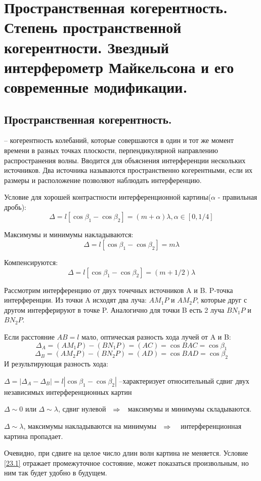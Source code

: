 \section{Пространственная когерентность. Степень пространственной когерентности. Звездный интерферометр Майкельсона и его современные модификации. } 
\subsection{Пространственная когерентность.}

  --  когерентность колебаний, которые совершаются в один и тот же момент времени в разных точках плоскости, перпендикулярной направлению распространения волны.
Вводится для объяснения интерференции нескольких источников.
Два источника называются пространственно когерентными, если их размеры и расположение позволяют наблюдать интерференцию.
\begin{theor}\label{2  некогерентных точечных источника.}

Условие для хорошей контрастности интерференционной картины($\alpha$ - правильная дробь):
\begin{equation}
\Delta = l[\cos{\beta_1}-\cos{\beta_2}]=(m+\alpha)\lambda, \alpha \in [0, 1/4]\label{23.1}
\end{equation}

Максимумы и минимумы накладываются:
\begin{equation}
\Delta = l[\cos{\beta_1}-\cos{\beta_2}]=m\lambda \label{23.2}
\end{equation}

Компенсируются:
\begin{equation}
\Delta = l[\cos{\beta_1}-\cos{\beta_2}]=(m+1/2)\lambda\label{23.3}
\end{equation}
\end{theor}
\begin{proofn}
Рассмотрим интерференцию от двух точечных источников A и B. P-точка интерференции. Из точки A исходят два луча: $AM_1P$ и $AM_2P$, которые друг с другом интерферируют в точке P. Аналогично для точки B есть 2 луча $BN_1P$ и $BN_2P$. 
\begin{figure}[H]
\center{\texttt{[image: 8]}}
\end{figure}
Если расстояние $AB=l$ мало, оптическая разность хода лучей от A и B:
$$\Delta_A=(AM_1P)-(BN_1P)=(AC)=\cos{BAC}=\cos{\beta_1}$$
$$\Delta_B=(AM_2P)-(BN_2P)=(AD)=\cos{BAD}=\cos{\beta_2}$$
 И результирующая разность хода:

$\Delta=|\Delta_A-\Delta_B|=l|\cos{\beta_1}-\cos{\beta_2}|$  --характеризует относительный сдвиг двух независимых интерференционных картин

$\Delta \sim 0$ или $\Delta \sim \lambda$, сдвиг нулевой$\quad \Rightarrow \quad$максимумы и минимумы складываются.

$\Delta \sim \lambda$,  максимумы накладываются на минимумы$\quad \Rightarrow \quad$ интерференционная картина пропадает.

Очевидно, при сдвиге на целое число длин волн картина не меняется.
Условие \ref{23.1} отражает промежуточное состояние, может показаться произвольным, но ним так будет удобно в будущем.
\end{proofn}
